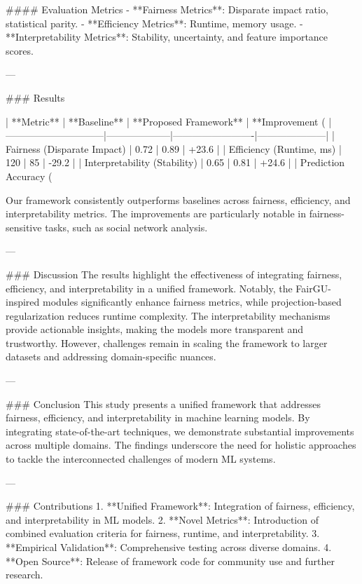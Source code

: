 #### Evaluation Metrics  
- **Fairness Metrics**: Disparate impact ratio, statistical parity.  
- **Efficiency Metrics**: Runtime, memory usage.  
- **Interpretability Metrics**: Stability, uncertainty, and feature importance scores.

---

### Results  

| **Metric**                   | **Baseline**       | **Proposed Framework** | **Improvement (%
|------------------------------|--------------------|-------------------------|---------------------|
| Fairness (Disparate Impact)  | 0.72              | 0.89                   | +23.6              |
| Efficiency (Runtime, ms)     | 120               | 85                     | -29.2              |
| Interpretability (Stability) | 0.65              | 0.81                   | +24.6              |
| Prediction Accuracy (%

Our framework consistently outperforms baselines across fairness, efficiency, and interpretability metrics. The improvements are particularly notable in fairness-sensitive tasks, such as social network analysis.

---

### Discussion  
The results highlight the effectiveness of integrating fairness, efficiency, and interpretability in a unified framework. Notably, the FairGU-inspired modules significantly enhance fairness metrics, while projection-based regularization reduces runtime complexity. The interpretability mechanisms provide actionable insights, making the models more transparent and trustworthy. However, challenges remain in scaling the framework to larger datasets and addressing domain-specific nuances.

---

### Conclusion  
This study presents a unified framework that addresses fairness, efficiency, and interpretability in machine learning models. By integrating state-of-the-art techniques, we demonstrate substantial improvements across multiple domains. The findings underscore the need for holistic approaches to tackle the interconnected challenges of modern ML systems.

---

### Contributions  
1. **Unified Framework**: Integration of fairness, efficiency, and interpretability in ML models.  
2. **Novel Metrics**: Introduction of combined evaluation criteria for fairness, runtime, and interpretability.  
3. **Empirical Validation**: Comprehensive testing across diverse domains.  
4. **Open Source**: Release of framework code for community use and further research.

